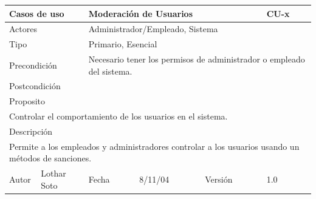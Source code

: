 \documentclass{article}
\begin{document}
\begin{table}[h]
\begin{tabular}{|l|l|l|l|l|l|}
\hline
\multicolumn{2}{|p{2cm}|}{Casos de uso}  & \multicolumn{3}{p{7cm}|}{Moderación de Usuarios} & CU-x \\
\hline
\multicolumn{2}{|p{2cm}|}{Actores}       & \multicolumn{4}{p{8cm}|}{Administrador/Empleado, Sistema}        \\
\hline
\multicolumn{2}{|p{2cm}|}{Tipo}          & \multicolumn{4}{p{8cm}|}{Primario, Esencial}        \\
\hline
\multicolumn{2}{|p{2cm}|}{Precondición}  & \multicolumn{4}{p{8cm}|}{Necesario tener los permisos de administrador o empleado del sistema.}        \\
\hline
\multicolumn{2}{|p{2cm}|}{Postcondición} & \multicolumn{4}{p{8cm}|}{}        \\
\hline
\multicolumn{6}{|p{10cm}|}{Proposito}                                   \\
\hline
\multicolumn{6}{|p{10cm}|}{Controlar el comportamiento de los usuarios en el sistema.}                                            \\
\hline
\multicolumn{6}{|p{10cm}|}{Descripción}                                 \\
\hline
\multicolumn{6}{|p{10cm}|}{Permite a los empleados y administradores controlar a los usuarios usando un métodos de sanciones.}                                            \\
\hline
Autor          &       Lothar Soto        & Fecha    &  8/11/04   &   Versión  & 1.0\\    
\hline
\end{tabular}
\end{table}
\end{document}
